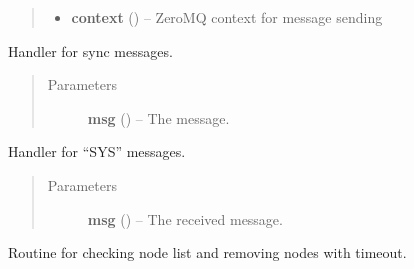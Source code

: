 \documentclass[letterpaper,10pt,english]{sphinxmanual}
\begin{document}
\begin{fulllineitems}
\begin{fulllineitems}
\begin{quote}
\begin{description}
\begin{itemize}
\item {} 
\textbf{context} () -- ZeroMQ context for message sending

\end{itemize}

\end{description}\end{quote}

\end{fulllineitems}


\begin{fulllineitems}
\label{api:swnp.SWNP.sync_handler}
Handler for sync messages.

\begin{quote}\begin{description}
\item[{Parameters}] \leavevmode
\textbf{msg} ({\hyperref[api:swnp.Message]{}}) -- The message.

\end{description}\end{quote}

\end{fulllineitems}


\begin{fulllineitems}
\label{api:swnp.SWNP.sys_handler}
Handler for ``SYS'' messages.
\begin{quote}\begin{description}
\item[{Parameters}] \leavevmode
\textbf{msg} ({\hyperref[api:swnp.Message]{}}) -- The received message.

\end{description}\end{quote}

\end{fulllineitems}


\begin{fulllineitems}
\label{api:swnp.SWNP.timeout_routine}
Routine for checking node list and removing nodes with timeout.

\end{fulllineitems}


\end{fulllineitems}
\end{document}
